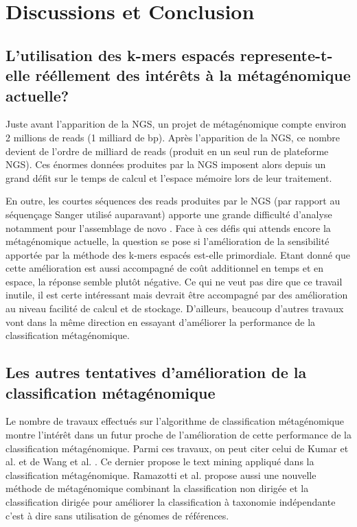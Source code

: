 \section{Discussions et Conclusion}


\subsection{L'utilisation des k-mers espacés represente-t-elle rééllement des intérêts à la métagénomique actuelle?}

Juste avant l'apparition de la NGS, un projet de métagénomique compte environ 2 millions de reads (1 milliard de bp). Après l'apparition de la NGS, ce nombre devient de l'ordre de milliard de reads \cite{Kumar2015} (produit en un seul run de plateforme NGS). Ces énormes données produites par la NGS imposent alors depuis un grand défit sur le temps de calcul et l'espace mémoire lors de leur traitement.

En outre, les courtes séquences des reads produites par le NGS (par rapport au séquençage Sanger utilisé auparavant) apporte une grande difficulté d'analyse notamment pour l'assemblage de novo \cite{Kumar2015}.
Face à ces défis qui attends encore la métagénomique actuelle, la question se pose si l'amélioration de la sensibilité apportée par la méthode des k-mers espacés est-elle primordiale. Etant donné que cette amélioration est aussi accompagné de coût additionnel en temps et en espace, la réponse semble plutôt négative. Ce qui ne veut pas dire que ce travail inutile, il est certe intéressant mais devrait être accompagné par des amélioration au niveau facilité de calcul et de stockage. D'ailleurs, beaucoup d'autres travaux vont dans la même direction en essayant d'améliorer la performance de la classification métagénomique.  


\subsection{Les autres tentatives d'amélioration de la classification métagénomique}

Le nombre de travaux effectués sur l'algorithme de classification métagénomique montre l'intérêt dans un futur proche de l'amélioration de cette performance de la classification métagénomique.
Parmi ces travaux, on peut citer celui de Kumar et al. \cite{Kumar2015} et de Wang et al. \cite{Wang2015}. 
Ce dernier propose le text mining appliqué dans la classification métagénomique.
Ramazotti et al. propose aussi une nouvelle méthode de métagénomique combinant la classification non dirigée et la classification dirigée pour améliorer la classification à taxonomie indépendante c'est à dire sans utilisation de génomes de références.


